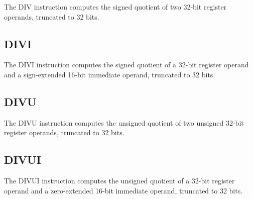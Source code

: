 The DIV instruction computes the signed quotient of two 32-bit register operands, truncated to 32 bits.\\


\begin{effectize}
\rdivzero
{}
\end{effectize}

\subsection{DIVI}

The DIVI instruction computes the signed quotient of a 32-bit register operand and a sign-extended 16-bit immediate operand, truncated to 32 bits.\\


\begin{effectize}
\idivzero
{}
\end{effectize}

\subsection{DIVU}

The DIVU instruction computes the unsigned quotient of two unsigned 32-bit register operands, truncated to 32 bits.\\


\begin{effectize}
\rdivzero
{}
\end{effectize}

\subsection{DIVUI}

The DIVUI instruction computes the unsigned quotient of a 32-bit register operand and a zero-extended 16-bit immediate operand, truncated to 32 bits.\\


\begin{effectize}
\idivzero
{}
\end{effectize}

